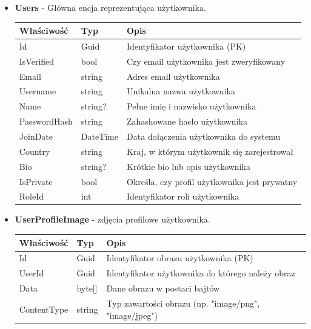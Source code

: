\documentclass[12pt,a4paper]{article}
\begin{document}
\begin{itemize}
    \item \textbf{Users} - Główna encja reprezentująca użytkownika.
    \begin{longtable}{|m{4cm}|m{2cm}|m{8cm}|}
        \hline
        \textbf{Właściwość} & \textbf{Typ} & \textbf{Opis} \\ \hline
        \endhead
        \hline
        Id & Guid & Identyfikator użytkownika (PK) \\ \hline
        IsVerified & bool & Czy email użytkownika jest zweryfikowany \\ \hline
        Email & string & Adres email użytkownika \\ \hline
        Username & string & Unikalna nazwa użytkownika \\ \hline
        Name & string? & Pełne imię i nazwisko użytkownika \\ \hline
        PasswordHash & string & Zahashowane hasło użytkownika \\ \hline
        JoinDate & DateTime & Data dołączenia użytkownika do systemu \\ \hline
        Country & string & Kraj, w którym użytkownik się zarejestrował \\ \hline
        Bio & string? & Krótkie bio lub opis użytkownika \\ \hline
        IsPrivate & bool & Określa, czy profil użytkownika jest prywatny \\ \hline
        RoleId & int & Identyfikator roli użytkownika\\ \hline
    \end{longtable}

    \item \textbf{UserProfileImage} - zdjęcia profilowe użytkownika.
    \begin{longtable}{|m{4cm}|m{2cm}|m{8cm}|}
        \hline
        \textbf{Właściwość} & \textbf{Typ} & \textbf{Opis} \\ \hline
        \endhead
        \hline
        Id & Guid & Identyfikator obrazu użytkownika (PK) \\ \hline
        UserId & Guid & Identyfikator użytkownika do którego należy obraz \\ \hline
        Data & byte[] & Dane obrazu w postaci bajtów \\ \hline
        ContentType & string & Typ zawartości obrazu (np. "image/png", "image/jpeg") \\ \hline
    \end{longtable}
        

\end{itemize}
\end{document}
